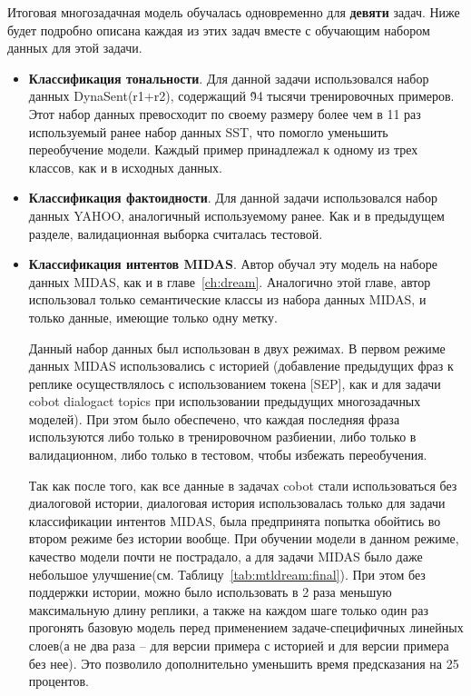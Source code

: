 Итоговая многозадачная модель обучалась одновременно для \textbf{девяти} задач. Ниже будет подробно описана каждая из этих задач вместе с обучающим набором данных для этой задачи. 
\begin{itemize} 
\item\textbf{Классификация тональности}. Для данной задачи использовался набор данных DynaSent(r1+r2)\cite{dynasent}, содержащий \~ 94 тысячи тренировочных примеров. Этот набор данных превосходит по своему размеру более чем в 11 раз используемый ранее набор данных SST\cite{sst}, что помогло уменьшить переобучение модели. Каждый пример принадлежал к одному из трех классов, как и в исходных данных. 

\item\textbf{Классификация фактоидности}. Для данной задачи использовался набор данных YAHOO\cite{yahoo}, аналогичный используемому ранее. Как и в предыдущем разделе, валидационная выборка считалась тестовой. 

\item\textbf{Классификация интентов MIDAS}. Автор обучал эту модель на наборе данных MIDAS, как и в главе~\ref{ch:dream}. Аналогично этой главе, автор использовал только семантические классы из набора данных MIDAS, и только данные, имеющие только одну метку. 

Данный набор данных был использован в двух режимах. В первом режиме данных MIDAS использовались с историей (добавление предыдущих фраз к реплике осуществлялось с использованием токена [SEP], как и для задачи {cobot dialogact topics} при использовании предыдущих многозадачных моделей). При этом было обеспечено, что каждая последняя фраза используются либо только в тренировочном разбиении, либо только в валидационном, либо только в тестовом, чтобы избежать переобучения.

Так как после того, как все данные в задачах {cobot} стали использоваться без диалоговой истории, диалоговая история использовалась только для задачи классификации интентов MIDAS, была предпринята попытка обойтись во втором режиме без истории вообще. При обучении модели в данном режиме, качество модели почти не пострадало, а для задачи MIDAS было даже небольшое улучшение(см. Таблицу~\ref{tab:mtldream:final}). При этом без поддержки истории, можно было использовать в 2 раза меньшую максимальную длину реплики, а также на каждом шаге только один раз прогонять базовую модель перед применением задаче-специфичных линейных слоев(а не два раза -- для версии примера с историей и для версии примера без нее). Это позволило дополнительно уменьшить время предсказания на 25 процентов.


\end{itemize}
